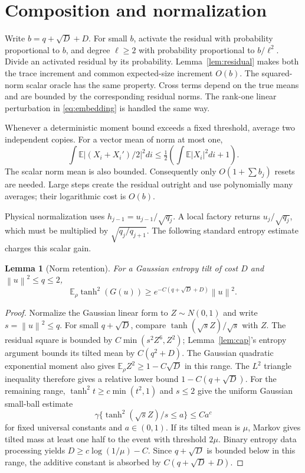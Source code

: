 \documentclass[11pt]{article}
\newtheorem{lemma}[theorem]{Lemma}
\newcommand{\E}{\mathbb E}
\newcommand{\norm}[1]{\left\lVert #1\right\rVert}
\begin{document}
\section{Composition and normalization}
Write $b=q+\sqrt D+D$. For small $b$, activate the residual with probability proportional to $b$, and degree $\ell\ge2$ with probability proportional to $b/\ell^2$. Divide an activated residual by its probability. Lemma~\ref{lem:residual} makes both the trace increment and common expected-size increment $O(b)$. The squared-norm scalar oracle has the same property. Cross terms depend on the true means and are bounded by the corresponding residual norms. The rank-one linear perturbation in \eqref{eq:embedding} is handled the same way.

Whenever a deterministic moment bound exceeds a fixed threshold, average two independent copies. For a vector mean of norm at most one,
\[
 \int\E\left|(X_i+X_i')/2\right|^2di
 \le\tfrac12\left(\int\E|X_i|^2di+1\right).
\]
The scalar norm mean is also bounded. Consequently only $O(1+\sum b_j)$ resets are needed. Large steps create the residual outright and use polynomially many averages; their logarithmic cost is $O(b)$.

Physical normalization uses $h_{j-1}=u_{j-1}/\sqrt{q_j}$. A local factory returns $u_j/\sqrt{q_j}$, which must be multiplied by $\sqrt{q_j/q_{j+1}}$. The following standard entropy estimate charges this scalar gain.

\begin{lemma}[Norm retention]
\label{lem:retention}
For a Gaussian entropy tilt of cost $D$ and $\norm u^2\le q\le2$,
\[
 \E_\rho\tanh^2(G(u))\ge
 e^{-C(q+\sqrt D+D)}\norm u^2.
\]
\end{lemma}
\begin{proof}
Normalize the Gaussian linear form to $Z\sim N(0,1)$ and write $s=\norm u^2\le q$. For small $q+\sqrt D$, compare $\tanh(\sqrt sZ)/\sqrt s$ with $Z$. The residual square is bounded by $C\min(s^2Z^6,Z^2)$; Lemma~\ref{lem:cap}'s entropy argument bounds its tilted mean by $C(q^2+D)$. The Gaussian quadratic exponential moment also gives $\E_\rho Z^2\ge1-C\sqrt D$ in this range. The $L^2$ triangle inequality therefore gives a relative lower bound $1-C(q+\sqrt D)$. For the remaining range, $\tanh^2 t\ge c\min(t^2,1)$ and $s\le2$ give the uniform Gaussian small-ball estimate
\[
 \gamma\{\tanh^2(\sqrt sZ)/s\le a\}\le Ca^c
\]
for fixed universal constants and $a\in(0,1)$. If its tilted mean is $\mu$, Markov gives tilted mass at least one half to the event with threshold $2\mu$. Binary entropy data processing yields $D\ge c\log(1/\mu)-C$. Since $q+\sqrt D$ is bounded below in this range, the additive constant is absorbed by $C(q+\sqrt D+D)$.
\end{proof}
\end{document}
